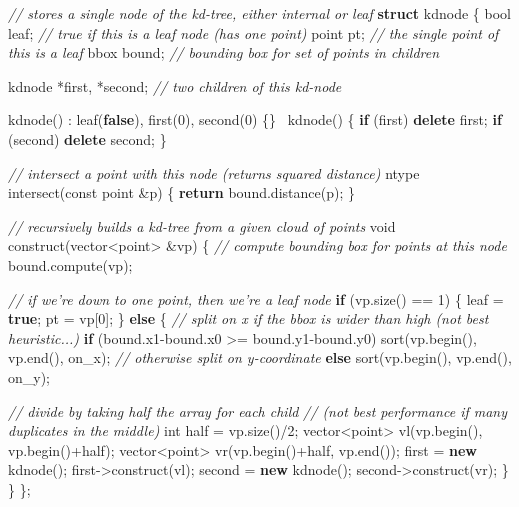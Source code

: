 \documentclass[10pt,]{article}
\newenvironment{Shaded}{}{}
\newcommand{\KeywordTok}[1]{\textcolor[rgb]{0.00,0.44,0.13}{\textbf{{#1}}}}
\newcommand{\DataTypeTok}[1]{\textcolor[rgb]{0.56,0.13,0.00}{{#1}}}
\newcommand{\DecValTok}[1]{\textcolor[rgb]{0.25,0.63,0.44}{{#1}}}
\newcommand{\CommentTok}[1]{\textcolor[rgb]{0.38,0.63,0.69}{\textit{{#1}}}}
\newcommand{\NormalTok}[1]{{#1}}
\begin{document}
\begin{Shaded}
\begin{Highlighting}[]
\CommentTok{// stores a single node of the kd-tree, either internal or leaf}
\KeywordTok{struct} \NormalTok{kdnode }
\NormalTok{\{}
    \DataTypeTok{bool} \NormalTok{leaf;      }\CommentTok{// true if this is a leaf node (has one point)}
    \NormalTok{point pt;       }\CommentTok{// the single point of this is a leaf}
    \NormalTok{bbox bound;     }\CommentTok{// bounding box for set of points in children}
    
    \NormalTok{kdnode *first, *second; }\CommentTok{// two children of this kd-node}
    
    \NormalTok{kdnode() : leaf(}\KeywordTok{false}\NormalTok{), first(}\DecValTok{0}\NormalTok{), second(}\DecValTok{0}\NormalTok{) \{\}}
    \NormalTok{~kdnode() \{ }\KeywordTok{if} \NormalTok{(first) }\KeywordTok{delete} \NormalTok{first; }\KeywordTok{if} \NormalTok{(second) }\KeywordTok{delete} \NormalTok{second; \}}
    
    \CommentTok{// intersect a point with this node (returns squared distance)}
    \NormalTok{ntype intersect(}\DataTypeTok{const} \NormalTok{point &p) \{}
        \KeywordTok{return} \NormalTok{bound.distance(p);}
    \NormalTok{\}}
    
    \CommentTok{// recursively builds a kd-tree from a given cloud of points}
    \DataTypeTok{void} \NormalTok{construct(vector<point> &vp)}
    \NormalTok{\{}
        \CommentTok{// compute bounding box for points at this node}
        \NormalTok{bound.compute(vp);}
        
        \CommentTok{// if we're down to one point, then we're a leaf node}
        \KeywordTok{if} \NormalTok{(vp.size() == }\DecValTok{1}\NormalTok{) \{}
            \NormalTok{leaf = }\KeywordTok{true}\NormalTok{;}
            \NormalTok{pt = vp[}\DecValTok{0}\NormalTok{];}
        \NormalTok{\}}
        \KeywordTok{else} \NormalTok{\{}
            \CommentTok{// split on x if the bbox is wider than high (not best heuristic...)}
            \KeywordTok{if} \NormalTok{(bound.x1-bound.x0 >= bound.y1-bound.y0)}
                \NormalTok{sort(vp.begin(), vp.end(), on_x);}
            \CommentTok{// otherwise split on y-coordinate}
            \KeywordTok{else}
                \NormalTok{sort(vp.begin(), vp.end(), on_y);}
            
            \CommentTok{// divide by taking half the array for each child}
            \CommentTok{// (not best performance if many duplicates in the middle)}
            \DataTypeTok{int} \NormalTok{half = vp.size()/}\DecValTok{2}\NormalTok{;}
            \NormalTok{vector<point> vl(vp.begin(), vp.begin()+half);}
            \NormalTok{vector<point> vr(vp.begin()+half, vp.end());}
            \NormalTok{first = }\KeywordTok{new} \NormalTok{kdnode();   first->construct(vl);}
            \NormalTok{second = }\KeywordTok{new} \NormalTok{kdnode();  second->construct(vr);            }
        \NormalTok{\}}
    \NormalTok{\}}
\NormalTok{\};}


\end{Highlighting}
\end{Shaded}
\end{document}
